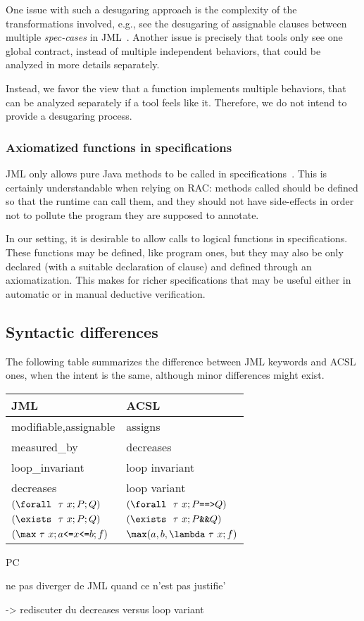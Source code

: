 One issue with such a desugaring approach is the complexity of the
transformations involved, e.g., see the desugaring of assignable clauses
between multiple \textit{spec-cases} in
JML~\cite{raghavan00desugaring}.  Another issue is precisely that
tools only see one global contract, instead of multiple independent
behaviors, that could be analyzed in more details separately.

Instead, we favor the view that a function implements multiple
behaviors, that can be analyzed separately if a tool feels like
it. Therefore, we do not intend to provide a desugaring process.

\subsubsection*{Axiomatized functions in specifications}

JML only allows pure Java methods to be called in
specifications~\cite{leavens00preliminary}. This is certainly
understandable when relying on RAC: methods called should be defined
so that the runtime can call them, and they should not have
side-effects in order not to pollute the program they are supposed to
annotate. 

In our setting, it is desirable to allow calls to logical functions in
specifications. These functions may be defined, like program ones, but
they may also be only declared (with a suitable declaration of \reads
clause) and defined through an axiomatization. 
This makes for richer specifications that may be useful either in
automatic or in manual deductive verification.

\subsection{Syntactic differences}

The following table summarizes the difference between JML keywords and
ACSL ones, when the intent is the same, although minor differences
might exist.

\begin{center}
\begin{tabular}{|l|l|}
\hline
  JML                  & ACSL \\ \hline
  modifiable,assignable           & assigns \\
  measured\_by         & decreases \\
  loop\_invariant      & loop invariant \\
  decreases            & loop variant \\
  $(\texttt{{\textbackslash}forall}~~\tau~x ; P ; Q)$ &   $(\Forall~\tau~x ; P \verb|==>| Q)$ \\
  $(\texttt{{\textbackslash}exists}~~\tau~x ; P ; Q)$ &   $(\Exists~\tau~x ; P \verb|&&| Q)$ \\
  $(\verb|\max|~\tau~x ; a \verb|<=| x \verb|<=| b ; f)$ &   
  $\verb|\max|(a,b,\verb|\lambda|~\tau~x ; f)$ \\
  \hline
\end{tabular}
\end{center}


\begin{remark}{PC}

  ne pas diverger de JML quand ce n'est pas justifie'


  -> rediscuter du decreases versus loop variant

\end{remark}


